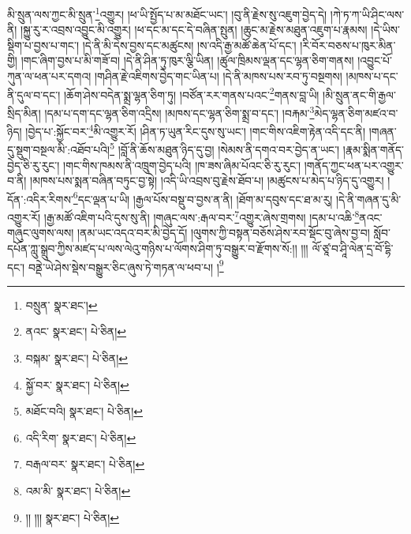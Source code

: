 མི་སྲུན་ལས་ཀྱང་མི་སྲུན་\footnote{བསྲུན་  སྣར་ཐང་། }འགྱུར། །ཕ་ཡི་སྤྱོད་པ་མ་མཐོང་ཡང་། །བུ་ནི་རྗེས་སུ་འཇུག་བྱེད་དེ། །ཀེ་ཏ་ཀ་ཡི་ཤིང་ལས་ནི། །སྐྱུ་རུ་ར་འབྲས་འབྱུང་མི་འགྱུར། །ཕ་དང་མ་དང་དེ་བཞིན་སྤུན། །ཆུང་མ་རྗེས་མཐུན་འཇུག་པ་རྣམས། །དེ་ཡིས་སྡིག་པ་བྱས་པ་གང་། །དེ་ནི་མི་དེས་བྱས་དང་མཚུངས། །ས་འདི་རྒྱ་མཚོ་ཆེན་པོ་དང་། །རི་བོར་བཅས་པ་ཁུར་མིན་གྱི། །གང་ཞིག་བྱས་པ་མི་གཟོ་བ། །དེ་ནི་ཤིན་ཏུ་ཁུར་ལྕི་ཡིན། །ཚུལ་ཁྲིམས་ལྡན་དང་ལྷན་ཅིག་གནས། །འབྱུང་པོ་ཀུན་ལ་ཕན་པར་དགའ། །གཤིན་རྗེ་འཇིགས་བྱེད་གང་ཡིན་པ། །དེ་ནི་མཁས་པས་རབ་ཏུ་བསྔགས། །མཁས་པ་དང་ནི་དུལ་བ་དང་། །ཆོག་ཤེས་བདེན་སྨྲ་ལྷན་ཅིག་ཏུ། །བཙོན་རར་གནས་པའང་\footnote{ནའང་  སྣར་ཐང་།  པེ་ཅིན། }གནས་བླ་ཡི། །མི་སྲུན་ནང་གི་རྒྱལ་སྲིད་མིན། །དམ་པ་དག་དང་ལྷན་ཅིག་འདྲིས། །མཁས་དང་ལྷན་ཅིག་སྨྲ་བ་དང་། །བརྐམ་\footnote{བསྐམ་  སྣར་ཐང་།  པེ་ཅིན། }མེད་ལྷན་ཅིག་མཛའ་བ་ཉིད། །བྱེད་པ་:སྐྱོང་བར་\footnote{སྐྱོ་བར་  སྣར་ཐང་།  པེ་ཅིན། }མི་འགྱུར་རོ། །ཤིན་ཏ་ཡུན་རིང་དུས་སུ་ཡང་། །གང་གིས་འཇིག་རྟེན་འདི་དང་ནི། །གཞན་དུ་སྡུག་བསྔལ་མི་:འཐོབ་པའི།\footnote{མཐོང་བའི།  སྣར་ཐང་།  པེ་ཅིན། } །བློ་ནི་ཆོས་མཐུན་ཉིད་དུ་བྱ། །སེམས་ནི་དགའ་བར་བྱེད་ན་ཡང་། །རྣམ་སྨིན་གནོད་བྱེད་ཅི་རུ་རུང་། །གང་གིས་ཁམས་ནི་འཁྲུག་བྱེད་པའི། །ཁ་ཟས་ཞིམ་པོའང་ཅི་རུ་རུང་། །གནོད་ཀྱང་ཕན་པར་འགྱུར་བ་ནི། །མཁས་པས་སྨན་བཞིན་བཏུང་བྱ་སྟེ། །འདི་ཡི་འབྲས་བུ་རྗེས་ཐོབ་པ། །མཚུངས་པ་མེད་པ་ཉིད་དུ་འགྱུར། །དོན་:འདིར་རིགས་\footnote{འདི་རིག་  སྣར་ཐང་།  པེ་ཅིན། }དང་ལྡན་པ་ཡི། །རྒྱལ་པོས་བསྡུ་བ་བྱས་ན་ནི། །ཐོག་མ་དབུས་དང་ཐ་མ་རུ། །དེ་ནི་གཞན་དུ་མི་འགྱུར་རོ། །རྒྱ་མཚོ་འཇིག་པའི་དུས་སུ་ནི། །གཞུང་ལས་:རྒལ་བར་\footnote{བརྒལ་བར་  སྣར་ཐང་།  པེ་ཅིན། }འགྱུར་ཞེས་གྲགས། །དམ་པ་འཆི་\footnote{འམ་མི་  སྣར་ཐང་།  པེ་ཅིན། }ནའང་གཞུང་ལུགས་ལས། །ནམ་ཡང་འདའ་བར་མི་བྱེད་དོ། །ལུགས་ཀྱི་བསྟན་བཅོས་ཤེས་རབ་སྡོང་བུ་ཞེས་བྱ་བ། སློབ་དཔོན་ཀླུ་སྒྲུབ་ཀྱིས་མཛད་པ་ལས་ལེའུ་གཉིས་པ་ལོགས་ཤིག་ཏུ་བསྒྱུར་བ་རྫོགས་སོ:།། །།། ལོ་ཙཱ་བ་ཤཱི་ལེན་དྲ་བོ་དྷི་དང་། བནྡེ་ཡེ་ཤེས་སྡེས་བསྒྱུར་ཅིང་ཞུས་ཏེ་གཏན་ལ་ཕབ་པ། །\footnote{།། །།།  སྣར་ཐང་།  པེ་ཅིན། }